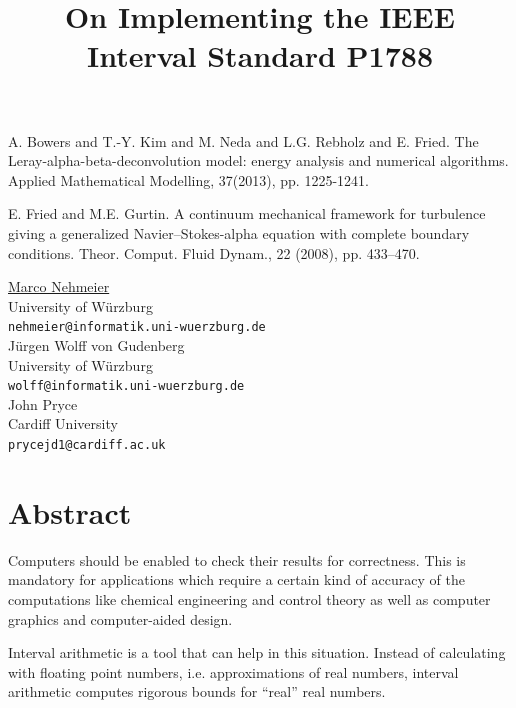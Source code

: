 \documentclass[article,A4,11pt]{llncs}%
\begin{document}

\begin{thebibliography}{10}
{\sc A. Bowers and T.-Y. Kim and M. Neda and L.G. Rebholz and E. Fried}. {The Leray-alpha-beta-deconvolution model: energy analysis and numerical algorithms}. Applied Mathematical Modelling, 37(2013), pp. 1225-1241.

{\sc E. Fried and M.E. Gurtin}. {A continuum mechanical framework for turbulence giving a generalized Navier–Stokes-alpha equation with complete boundary conditions}. Theor. Comput. Fluid Dynam., 22 (2008), pp. 433–470.
\end{thebibliography}

\title{On Implementing  the IEEE Interval Standard P1788}
 \author{} \institute{}
\maketitle
\begin{center}
{\large \underline{Marco Nehmeier}}\\
University of W\"urzburg\\
{\tt nehmeier@informatik.uni-wuerzburg.de}
\\ \vspace{4mm}
{\large J\"urgen Wolff von Gudenberg}\\
University of W\"urzburg\\
{\tt wolff@informatik.uni-wuerzburg.de}
\\ \vspace{4mm}
{\large John Pryce}\\
Cardiff University\\
{\tt prycejd1@cardiff.ac.uk}
\end{center}

\section*{Abstract}
Computers should be enabled 
to check their results for correctness. 
This is mandatory for applications which require a certain kind of accuracy of 
the computations like chemical engineering 
and control theory  as well as computer graphics and computer-aided 
design. 
 
Interval arithmetic is a tool that can help in this situation. Instead of 
calculating with floating point numbers, i.e. approximations of real numbers, 
interval arithmetic computes rigorous bounds for ``real'' real numbers. 
\end{document}
